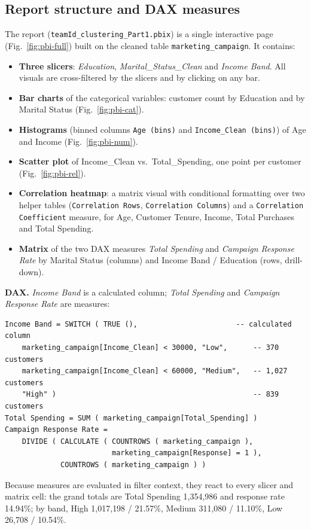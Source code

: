 \documentclass[11pt]{article}
\begin{document}
\subsection{Report structure and DAX measures}
The report (\texttt{teamId\_clustering\_Part1.pbix}) is a single interactive page
(Fig.~\ref{fig:pbi-full}) built on the cleaned table \texttt{marketing\_campaign}. It contains:
\begin{itemize}
\item \textbf{Three slicers}: \emph{Education}, \emph{Marital\_Status\_Clean} and \emph{Income Band}.
All visuals are cross-filtered by the slicers and by clicking on any bar.
\item \textbf{Bar charts} of the categorical variables: customer count by Education and by
Marital Status (Fig.~\ref{fig:pbi-cat}).
\item \textbf{Histograms} (binned columns \texttt{Age (bins)} and \texttt{Income\_Clean (bins)}) of
Age and Income (Fig.~\ref{fig:pbi-num}).
\item \textbf{Scatter plot} of Income\_Clean vs.\ Total\_Spending, one point per customer
(Fig.~\ref{fig:pbi-rel}).
\item \textbf{Correlation heatmap}: a matrix visual with conditional formatting over two helper
tables (\texttt{Correlation Rows}, \texttt{Correlation Columns}) and a \texttt{Correlation
Coefficient} measure, for Age, Customer Tenure, Income, Total Purchases and Total Spending.
\item \textbf{Matrix} of the two DAX measures \emph{Total Spending} and \emph{Campaign Response Rate}
by Marital Status (columns) and Income Band / Education (rows, drill-down).
\end{itemize}
\textbf{DAX.} \emph{Income Band} is a calculated column; \emph{Total Spending} and \emph{Campaign
Response Rate} are measures:
\begin{lstlisting}
Income Band = SWITCH ( TRUE (),                       -- calculated column
    marketing_campaign[Income_Clean] < 30000, "Low",      -- 370 customers
    marketing_campaign[Income_Clean] < 60000, "Medium",   -- 1,027 customers
    "High" )                                              -- 839 customers
Total Spending = SUM ( marketing_campaign[Total_Spending] )
Campaign Response Rate =
    DIVIDE ( CALCULATE ( COUNTROWS ( marketing_campaign ),
                         marketing_campaign[Response] = 1 ),
             COUNTROWS ( marketing_campaign ) )
\end{lstlisting}
Because measures are evaluated in filter context, they react to every slicer and matrix cell: the
grand totals are Total Spending 1{,}354{,}986 and response rate 14.94\%; by band, High
1{,}017{,}198 / 21.57\%, Medium 311{,}080 / 11.10\%, Low 26{,}708 / 10.54\%.
\end{document}
